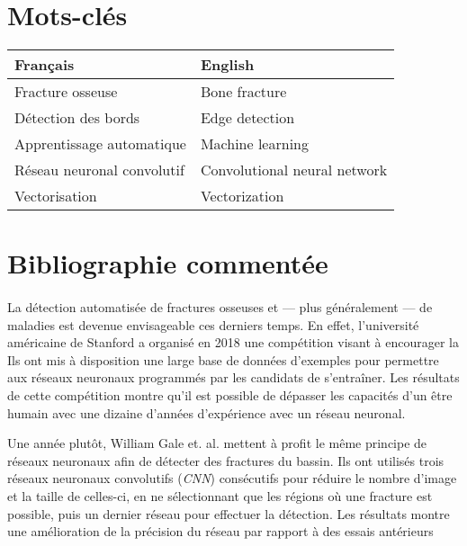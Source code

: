 \documentclass[a4paper]{article}
\begin{document}
\section{Mots-clés}

\begin{table}[h]
    \centering
    \label{tab:keywords}
    \begin{tabular}{l|l}
    Français & English \\\hline
    Fracture osseuse & Bone fracture \\
    Détection des bords & Edge detection \\
    Apprentissage automatique & Machine learning \\
    Réseau neuronal convolutif & Convolutional neural network  \\
    Vectorisation & Vectorization \\
    \end{tabular}
\end{table}

\section{Bibliographie commentée}

\paragraph{}

La détection automatisée de fractures osseuses et --- plus généralement --- de maladies est devenue envisageable ces
derniers temps. En effet, l'université américaine de Stanford a organisé en 2018 une compétition visant à encourager la
Ils ont mis à disposition une large base de données d'exemples pour permettre aux réseaux neuronaux programmés par les
candidats de s'entraîner.  Les résultats de cette compétition montre qu'il est possible de dépasser les capacités d'un
être humain avec une dizaine d'années d'expérience avec un réseau neuronal\cite{mura-competition}.

Une année plutôt, William Gale et. al. mettent à profit le même principe de réseaux neuronaux afin de détecter des
fractures du bassin\cite{detect-hip}.  Ils ont utilisés trois réseaux neuronaux convolutifs (\emph{CNN}) consécutifs
pour réduire le nombre d'image et la taille de celles-ci, en ne sélectionnant que les régions où une fracture est
possible, puis un dernier réseau pour effectuer la détection. Les résultats montre une amélioration de la précision du
réseau par rapport à des essais antérieurs
\end{document}

